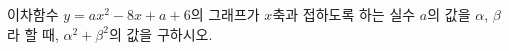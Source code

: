 이차함수 $y=ax^2-8x+a+6$의 그래프가 $x$축과 접하도록 하는 실수 $a$의 값을 $\alpha$, $\beta$라 할 때, $\alpha^2+\beta^2$의 값을 구하시오.

